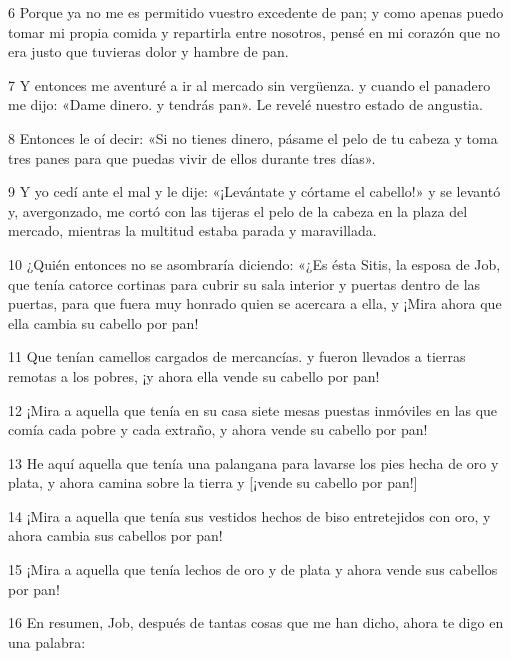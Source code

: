 \par 6 Porque ya no me es permitido vuestro excedente de pan; y como apenas puedo tomar mi propia comida y repartirla entre nosotros, pensé en mi corazón que no era justo que tuvieras dolor y hambre de pan.

\par 7 Y entonces me aventuré a ir al mercado sin vergüenza. y cuando el panadero me dijo: «Dame dinero. y tendrás pan». Le revelé nuestro estado de angustia.

\par 8 Entonces le oí decir: «Si no tienes dinero, pásame el pelo de tu cabeza y toma tres panes para que puedas vivir de ellos durante tres días».

\par 9 Y yo cedí ante el mal y le dije: «¡Levántate y córtame el cabello!» y se levantó y, avergonzado, me cortó con las tijeras el pelo de la cabeza en la plaza del mercado, mientras la multitud estaba parada y maravillada.

\par 10 ¿Quién entonces no se asombraría diciendo: «¿Es ésta Sitis, la esposa de Job, que tenía catorce cortinas para cubrir su sala interior y puertas dentro de las puertas, para que fuera muy honrado quien se acercara a ella, y ¡Mira ahora que ella cambia su cabello por pan!

\par 11 Que tenían camellos cargados de mercancías. y fueron llevados a tierras remotas a los pobres, ¡y ahora ella vende su cabello por pan!

\par 12 ¡Mira a aquella que tenía en su casa siete mesas puestas inmóviles en las que comía cada pobre y cada extraño, y ahora vende su cabello por pan!

\par 13 He aquí aquella que tenía una palangana para lavarse los pies hecha de oro y plata, y ahora camina sobre la tierra y [¡vende su cabello por pan!]

\par 14 ¡Mira a aquella que tenía sus vestidos hechos de biso entretejidos con oro, y ahora cambia sus cabellos por pan!

\par 15 ¡Mira a aquella que tenía lechos de oro y de plata y ahora vende sus cabellos por pan!

\par 16 En resumen, Job, después de tantas cosas que me han dicho, ahora te digo en una palabra:

